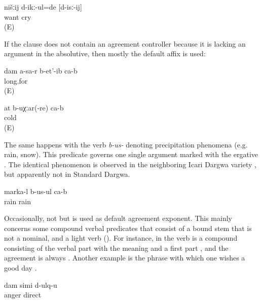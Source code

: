 %
\begin{exe}
		\ex	\label{ex:We wanted to cry@14c}
		\gll	nišːij	d-ikː-ul=de	[d-isː-ij]\\
				want	cry\\
		\glt	{} (E)
\end{exe}

If the clause does not contain an agreement controller because it is lacking an argument in the absolutive, then mostly the default affix  is used:
%
\begin{exe}
	\ex	\label{ex:I miss you@7}
	\gll	dam	a-sa-r	b-et'-ib ca-b\\
				long.for \\
	\glt	{} (E)

	\ex	\label{ex:You are cold@3a}
	\gll	at 	b-uχːar(-re)	ca-b\\
			cold	\\
	\glt	{} (E)
\end{exe}

The same happens with the verb \textit{b-us-} denoting precipitation phenomena (e.g. rain, snow). This predicate governs one single argument marked with the ergative . The identical phenomenon is observed in the neighboring Icari Dargwa variety \citep[155]{Sumbatova.Mutalov2003}, but apparently not in Standard Dargwa.
%
\begin{exe}
	\ex	\label{ex:It is raining@4}
	\gll	marka-l	b-us-ul	ca-b\\
		rain	rain \\
	\glt	{}
\end{exe}

Occasionally, not  but  is used as default agreement exponent. This mainly concerns some compound verbal predicates that consist of a bound stem that is not a nominal, and a light verb (). For instance, in  the verb is a compound consisting of the verbal part  with the meaning  and a first part , and the agreement is always . Another example is the phrase with which one wishes a good day .
%
\begin{exe}
	\ex	\label{ex:I am angry@b}
	\gll	dam	simi	d-ulq-u\\
			anger	direct\\
	\glt	{}
\end{exe}

